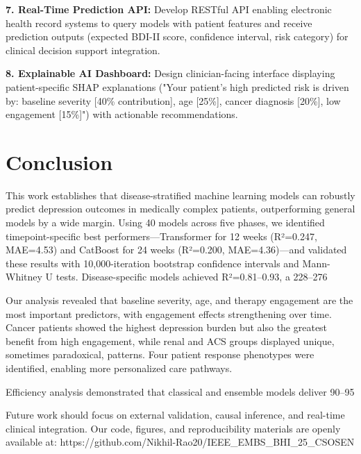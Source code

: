 \documentclass[conference]{IEEEtran}
\begin{document}
\textbf{7. Real-Time Prediction API:} Develop RESTful API enabling electronic health record systems to query models with patient features and receive prediction outputs (expected BDI-II score, confidence interval, risk category) for clinical decision support integration.

\textbf{8. Explainable AI Dashboard:} Design clinician-facing interface displaying patient-specific SHAP explanations ("Your patient's high predicted risk is driven by: baseline severity [40\% contribution], age [25\%], cancer diagnosis [20\%], low engagement [15\%]") with actionable recommendations.

\section{Conclusion}


This work establishes that disease-stratified machine learning models can robustly predict depression outcomes in medically complex patients, outperforming general models by a wide margin. Using 40 models across five phases, we identified timepoint-specific best performers—Transformer for 12 weeks (R²=0.247, MAE=4.53) and CatBoost for 24 weeks (R²=0.200, MAE=4.36)—and validated these results with 10,000-iteration bootstrap confidence intervals and Mann-Whitney U tests. Disease-specific models achieved R²=0.81–0.93, a 228–276%

Our analysis revealed that baseline severity, age, and therapy engagement are the most important predictors, with engagement effects strengthening over time. Cancer patients showed the highest depression burden but also the greatest benefit from high engagement, while renal and ACS groups displayed unique, sometimes paradoxical, patterns. Four patient response phenotypes were identified, enabling more personalized care pathways.

Efficiency analysis demonstrated that classical and ensemble models deliver 90–95%

Future work should focus on external validation, causal inference, and real-time clinical integration. Our code, figures, and reproducibility materials are openly available at: https://github.com/Nikhil-Rao20/IEEE_EMBS_BHI_25_CSOSEN
\end{document}
